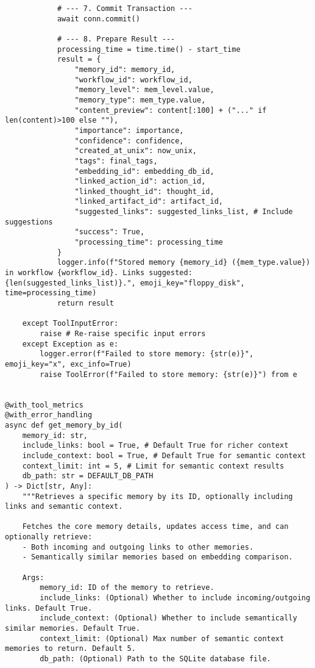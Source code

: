 \documentclass[12pt,a4paper]{article}
\begin{document}
\begin{pageablecode}
\begin{verbatim}
            # --- 7. Commit Transaction ---
            await conn.commit()

            # --- 8. Prepare Result ---
            processing_time = time.time() - start_time
            result = {
                "memory_id": memory_id,
                "workflow_id": workflow_id,
                "memory_level": mem_level.value,
                "memory_type": mem_type.value,
                "content_preview": content[:100] + ("..." if len(content)>100 else ""),
                "importance": importance,
                "confidence": confidence,
                "created_at_unix": now_unix,
                "tags": final_tags,
                "embedding_id": embedding_db_id,
                "linked_action_id": action_id,
                "linked_thought_id": thought_id,
                "linked_artifact_id": artifact_id,
                "suggested_links": suggested_links_list, # Include suggestions
                "success": True,
                "processing_time": processing_time
            }
            logger.info(f"Stored memory {memory_id} ({mem_type.value}) in workflow {workflow_id}. Links suggested: {len(suggested_links_list)}.", emoji_key="floppy_disk", time=processing_time)
            return result

    except ToolInputError:
        raise # Re-raise specific input errors
    except Exception as e:
        logger.error(f"Failed to store memory: {str(e)}", emoji_key="x", exc_info=True)
        raise ToolError(f"Failed to store memory: {str(e)}") from e
    

@with_tool_metrics
@with_error_handling
async def get_memory_by_id(
    memory_id: str,
    include_links: bool = True, # Default True for richer context
    include_context: bool = True, # Default True for semantic context
    context_limit: int = 5, # Limit for semantic context results
    db_path: str = DEFAULT_DB_PATH
) -> Dict[str, Any]:
    """Retrieves a specific memory by its ID, optionally including links and semantic context.

    Fetches the core memory details, updates access time, and can optionally retrieve:
    - Both incoming and outgoing links to other memories.
    - Semantically similar memories based on embedding comparison.

    Args:
        memory_id: ID of the memory to retrieve.
        include_links: (Optional) Whether to include incoming/outgoing links. Default True.
        include_context: (Optional) Whether to include semantically similar memories. Default True.
        context_limit: (Optional) Max number of semantic context memories to return. Default 5.
        db_path: (Optional) Path to the SQLite database file.


\end{verbatim}
\end{pageablecode}
\end{document}
